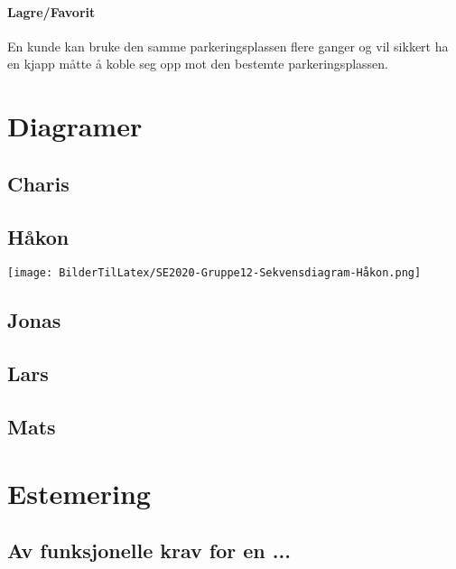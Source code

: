\documentclass[12pt]{article}
\begin{document}
            \paragraph{Lagre/Favorit}
            En kunde kan bruke den samme parkeringsplassen flere ganger og vil sikkert ha en kjapp måtte å koble seg opp mot den bestemte parkeringsplassen.

\section{Diagramer}

    \subsection{Charis}

    \newpage
    \subsection{Håkon}

    \texttt{[image: BilderTilLatex/SE2020-Gruppe12-Sekvensdiagram-Håkon.png]}


    \subsection{Jonas}

    \subsection{Lars}

    \subsection{Mats}

\section{Estemering}

    \subsection{Av funksjonelle krav for en ...}
\end{document}
